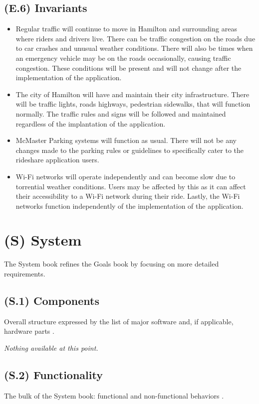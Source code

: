 \documentclass[12pt,letterpaper]{article}
\begin{document}
\subsection{(E.6) Invariants}
\begin{itemize}
\item Regular traffic will continue to move in Hamilton and surrounding areas where riders and drivers live. There can be traffic congestion on the roads due to car crashes and unusual weather conditions. There will also be times when an emergency vehicle may be on the roads occasionally, causing traffic congestion. These conditions will be present and will not change after the implementation of the application.  
\item The city of Hamilton will have and maintain their city infrastructure. There will be traffic lights, roads highways, pedestrian sidewalks, that will function normally.  The traffic rules and signs will be followed and maintained regardless of the implantation of the application. 
\item McMaster Parking systems will function as usual. There will not be any changes made to the parking rules or guidelines to specifically cater to the rideshare application users. 
\item Wi-Fi networks will operate independently and can become slow due to torrential weather conditions. Users may be affected by this as it can affect their accessibility to a Wi-Fi network during their ride. Lastly, the Wi-Fi networks function independently of the implementation of the application.  
\end{itemize}

\clearpage

\section{(S) System}
The System book refines the Goals book by focusing on more detailed requirements.

\subsection{(S.1) Components}
Overall structure expressed by the list of major software and, if applicable, hardware parts \cite{meyer2022}.

\textit{Nothing available at this point.}

\subsection{(S.2) Functionality}
The bulk of the System book: functional and non-functional behaviors \cite{meyer2022}.
\end{document}
